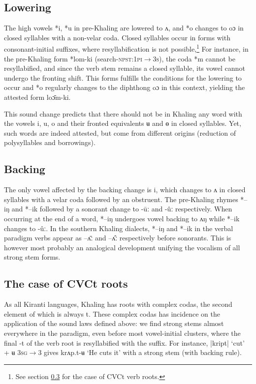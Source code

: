 \documentclass[oldfontcommands,oneside,a4paper,11pt]{article}
\newcommand{\ipa}[1]{{\phon \mbox{#1}}} %
\begin{document}
\subsection{Lowering} \label{sec:lowering}
The high vowels \ipa{*i}, \ipa{*u}   in pre-Khaling are lowered to \ipa{ʌ},  and   \ipa{*o} changes to \ipa{oɔ} in closed syllables with a non-velar coda. Closed syllables occur in forms with consonant-initial suffixes, where resyllabification is not possible,\footnote{See section \ref{sec:cvct} for the case of CVCt verb roots.} For instance, in the pre-Khaling form \ipa{*lom-ki} (search-\textsc{npst:1pi$\rightarrow$3s}), the coda \ipa{*m} cannot be resyllabified, and since the verb stem remains a closed syllable, its vowel cannot undergo the fronting shift. This forms fulfills the conditions for the lowering to occur and \ipa{*o} regularly changes to the diphthong \ipa{oɔ} in this context, yielding the attested form \ipa{loɔ̄m-ki}.


This sound change predicts that there should not be in Khaling any word with the vowels \ipa{i}, \ipa{u}, \ipa{o} and their fronted equivalents \ipa{ʉ} and \ipa{ɵ} in closed syllables. Yet, such words are indeed attested, but come from different origins (reduction of polysyllables and borrowings).

\subsection{Backing} \label{sec:backing}
The only vowel affected by the backing change is \ipa{i}, which changes to \ipa{ʌ} in closed syllables with a velar coda followed by an obstruent. The pre-Khaling rhymes \ipa{*--iŋ} and \ipa{*--ik}  followed by a sonorant change to \ipa{-ūː} and \ipa{-ûː} respectively. When occurring at the end of a word, \ipa{*--iŋ} undergoes vowel backing to \ipa{ʌŋ} while \ipa{*--ik}  changes to \ipa{-ûː}. In the southern Khaling dialects,  \ipa{*--iŋ} and \ipa{*--ik} in the verbal paradigm verbs appear as \ipa{--ʌ̄ː} and  \ipa{--ʌ̂ː} respectively before sonorants. This is however most probably an analogical development unifying the vocalism of all strong stem forms.


\subsection{The case of CVCt roots} \label{sec:cvct}
As all Kiranti languages, Khaling has roots with complex codas, the second element of which is always \ipa{t}. These complex codas has incidence on the application of the sound laws defined above: we find strong stems almost everywhere in the paradigm, even before most vowel-initial clusters, where the final \ipa{-t} of the verb root is resyllabified with the suffix. For instance,  |kript| `cut' + \ipa{ʉ} \textsc{3sg$\rightarrow$3} gives \ipa{krʌp.t-ʉ} `He cuts it' with a strong stem (with backing rule).
\end{document}
